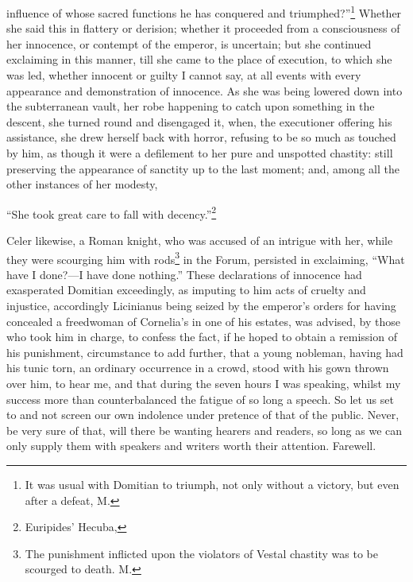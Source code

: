 influence of whose sacred functions he has conquered and triumphed?''\footnote{It was usual with
Domitian to triumph, not only without a victory, but even after a defeat,
M.}
Whether she said this in flattery or derision; whether it proceeded from a
consciousness of her innocence, or contempt of the emperor, is uncertain;
but she continued exclaiming in this manner, till she came to the place of
execution, to which she was led, whether innocent or guilty I cannot say,
at all events with every appearance and demonstration of innocence. As she
was being lowered down into the subterranean vault, her robe happening to
catch upon something in the descent, she turned round and disengaged it,
when, the executioner offering his assistance, she drew herself back with
horror, refusing to be so much as touched by him, as though it were a
defilement to her pure and unspotted chastity: still preserving the
appearance of sanctity up to the last moment; and, among all the other
instances of her modesty,

``She took great care to fall with decency.''\footnote{Euripides' Hecuba,}

Celer likewise, a Roman knight, who was accused of an intrigue with her,
while they were scourging him with rods\footnote{The punishment inflicted
upon the violators of Vestal chastity was to be scourged to death. M.} in the Forum, persisted
in exclaiming, ``What have I done?—I have done nothing.'' These
declarations of innocence had exasperated Domitian exceedingly, as
imputing to him acts of cruelty and injustice, accordingly Licinianus
being seized by the emperor's orders for having concealed a freedwoman of
Cornelia's in one of his estates, was advised, by those who took him in
charge, to confess the fact, if he hoped to obtain a remission of his
punishment, circumstance to add further, that a young nobleman, having had
his tunic torn, an ordinary occurrence in a crowd, stood with his gown
thrown over him, to hear me, and that during the seven hours I was
speaking, whilst my success more than counterbalanced the fatigue of so
long a speech. So let us set to and not screen our own indolence under
pretence of that of the public. Never, be very sure of that, will there be
wanting hearers and readers, so long as we can only supply them with
speakers and writers worth their attention. Farewell.


